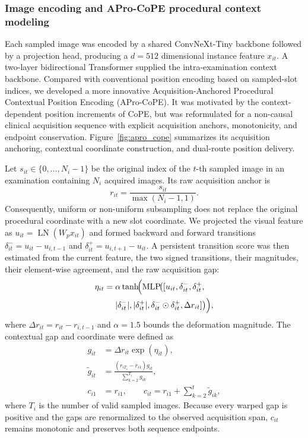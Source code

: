 \documentclass[Afour,sagev,times]{sagej}
\begin{document}
\subsubsection{Image encoding and APro-CoPE procedural context modeling}

Each sampled image was encoded by a shared ConvNeXt-Tiny backbone followed by a projection head, producing a $d=512$ dimensional instance feature $x_{it}$.\cite{R28} A two-layer bidirectional Transformer supplied the intra-examination context backbone. Compared with conventional position encoding based on sampled-slot indices, we developed a more innovative Acquisition-Anchored Procedural Contextual Position Encoding (APro-CoPE). It was motivated by the context-dependent position increments of CoPE, but was reformulated for a non-causal clinical acquisition sequence with explicit acquisition anchors, monotonicity, and endpoint conservation. Figure~\ref{fig:apro_cope} summarizes its acquisition anchoring, contextual coordinate construction, and dual-route position delivery.

Let $s_{it}\in\{0,\ldots,N_i-1\}$ be the original index of the $t$-th sampled image in an examination containing $N_i$ acquired images. Its raw acquisition anchor is
\begin{equation}
r_{it}=\frac{s_{it}}{\max(N_i-1,1)}.
\end{equation}
Consequently, uniform or non-uniform subsampling does not replace the original procedural coordinate with a new slot coordinate. We projected the visual feature as $u_{it}=\operatorname{LN}(W_px_{it})$ and formed backward and forward transitions $\delta^-_{it}=u_{it}-u_{i,t-1}$ and $\delta^+_{it}=u_{i,t+1}-u_{it}$. A persistent transition score was then estimated from the current feature, the two signed transitions, their magnitudes, their element-wise agreement, and the raw acquisition gap:
\begin{equation}
\begin{aligned}
\eta_{it}={}&\alpha\tanh\!\Bigl(\operatorname{MLP}\!\bigl(
[u_{it},\delta^-_{it},\delta^+_{it},\\
&|\delta^-_{it}|,|\delta^+_{it}|,
\delta^-_{it}\odot\delta^+_{it},\Delta r_{it}]\bigr)\Bigr),
\end{aligned}
\end{equation}
where $\Delta r_{it}=r_{it}-r_{i,t-1}$ and $\alpha=1.5$ bounds the deformation magnitude. The contextual gap and coordinate were defined as
\begin{align}
g_{it}&=\Delta r_{it}\exp(\eta_{it}),\\
\widetilde g_{it}&=\frac{(r_{iT_i}-r_{i1})g_{it}}{\sum_{k=2}^{T_i}g_{ik}},\\
c_{i1}&=r_{i1},\qquad c_{it}=r_{i1}+\sum_{k=2}^{t}\widetilde g_{ik},
\end{align}
where $T_i$ is the number of valid sampled images. Because every warped gap is positive and the gaps are renormalized to the observed acquisition span, $c_{it}$ remains monotonic and preserves both sequence endpoints.
\end{document}

